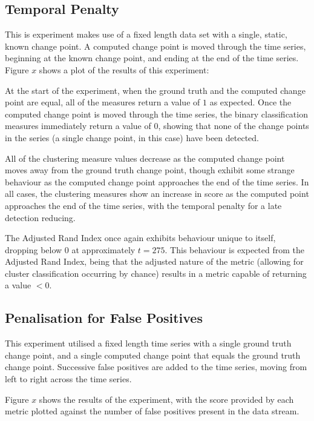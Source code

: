 \documentclass{uvamscse}	%
\begin{document}
\subsection{Temporal Penalty}

This is experiment makes use of a fixed length data set with a single, static, known change point. A computed change point is moved through the time series, beginning at the known change point, and ending at the end of the time series. Figure $x$ shows a plot of the results of this experiment:


At the start of the experiment, when the ground truth and the computed change point are equal, all of the measures return a value of $1$ as expected. Once the computed change point is moved through the time series, the binary classification measures immediately return a value of $0$, showing that none of the change points in the series (a single change point, in this case) have been detected.

All of the clustering measure values decrease as the computed change point moves away from the ground truth change point, though exhibit some strange behaviour as the computed change point approaches the end of the time series. In all cases, the clustering measures show an increase in score as the computed point approaches the end of the time series, with the temporal penalty for a late detection reducing.

The Adjusted Rand Index once again exhibits behaviour unique to itself, dropping below $0$ at approximately  $t=275$. This behaviour is expected from the Adjusted Rand Index, being that the adjusted nature of the metric (allowing for cluster classification occurring by chance) results in a metric capable of returning a value $<0$.

\subsection{Penalisation for False Positives}

This experiment utilised a fixed length time series with a single ground truth change point, and a single computed change point that equals the ground truth change point. Successive false positives are added to the time series, moving from left to right across the time series.

Figure $x$ shows the results of the experiment, with the score provided by each metric plotted against the number of false positives present in the data stream.
\end{document}
